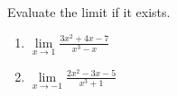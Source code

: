 Evaluate the limit if it exists.
\begin{enumerate}
\item $\lim\limits_{x\to 1} \frac{3x^2+4x-7}{x^3-x}$ 
\item $\lim\limits_{x\to -1} \frac{2x^2-3x-5}{x^3+1}$ 
\end{enumerate}

